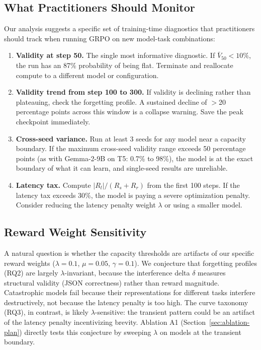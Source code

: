 \documentclass[11pt]{article}
\begin{document}
\subsection{What Practitioners Should Monitor}

Our analysis suggests a specific set of training-time diagnostics that practitioners should track when running GRPO on new model-task combinations:

\begin{enumerate}[leftmargin=*]
\item \textbf{Validity at step 50.} The single most informative diagnostic.  If $\bar{V}_{50} < 10\%$, the run has an 87\% probability of being flat.  Terminate and reallocate compute to a different model or configuration.

\item \textbf{Validity trend from step 100 to 300.} If validity is declining rather than plateauing, check the forgetting profile.  A sustained decline of $>$20 percentage points across this window is a collapse warning.  Save the peak checkpoint immediately.

\item \textbf{Cross-seed variance.} Run at least 3 seeds for any model near a capacity boundary.  If the maximum cross-seed validity range exceeds 50 percentage points (as with Gemma-2-9B on T5: 0.7\% to 98\%), the model is at the exact boundary of what it can learn, and single-seed results are unreliable.

\item \textbf{Latency tax.} Compute $|R_l| / (R_s + R_r)$ from the first 100 steps.  If the latency tax exceeds 30\%, the model is paying a severe optimization penalty.  Consider reducing the latency penalty weight $\lambda$ or using a smaller model.
\end{enumerate}

\subsection{Reward Weight Sensitivity}

A natural question is whether the capacity thresholds are artifacts of our specific reward weights ($\lambda = 0.1$, $\mu = 0.05$, $\gamma = 0.1$).  We conjecture that forgetting profiles (RQ2) are largely $\lambda$-invariant, because the interference delta $\delta$ measures structural validity (JSON correctness) rather than reward magnitude.  Catastrophic models fail because their representations for different tasks interfere destructively, not because the latency penalty is too high.  The curve taxonomy (RQ3), in contrast, is likely $\lambda$-sensitive: the transient pattern could be an artifact of the latency penalty incentivizing brevity.  Ablation A1 (Section~\ref{sec:ablation-plan}) directly tests this conjecture by sweeping $\lambda$ on models at the transient boundary.
\end{document}
